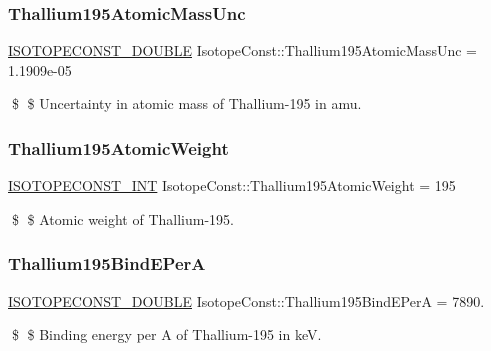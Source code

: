 \subsubsection{\texorpdfstring{Thallium195\+Atomic\+Mass\+Unc}{Thallium195AtomicMassUnc}}
{\footnotesize\ttfamily \mbox{\hyperlink{group___isotope_const-_macros_ga8f45a7272ce02c0b4c65c44636ed719a}{I\+S\+O\+T\+O\+P\+E\+C\+O\+N\+S\+T\+\_\+\+D\+O\+U\+B\+LE}} Isotope\+Const\+::\+Thallium195\+Atomic\+Mass\+Unc = 1.\+1909e-\/05}

\$ \$ Uncertainty in atomic mass of Thallium-\/195 in amu. \mbox{\label{group___isotope_const-_thallium-_tl195_gace0bae17108bd5e1c99ef020d8d00184}} 
\subsubsection{\texorpdfstring{Thallium195\+Atomic\+Weight}{Thallium195AtomicWeight}}
{\footnotesize\ttfamily \mbox{\hyperlink{group___isotope_const-_macros_ga5f18360b3e99483a35c32d789e62621c}{I\+S\+O\+T\+O\+P\+E\+C\+O\+N\+S\+T\+\_\+\+I\+NT}} Isotope\+Const\+::\+Thallium195\+Atomic\+Weight = 195}

\$ \$ Atomic weight of Thallium-\/195. \mbox{\label{group___isotope_const-_thallium-_tl195_ga50580592cfc79bf2a565b79cda903a25}} 
\subsubsection{\texorpdfstring{Thallium195\+Bind\+E\+PerA}{Thallium195BindEPerA}}
{\footnotesize\ttfamily \mbox{\hyperlink{group___isotope_const-_macros_ga8f45a7272ce02c0b4c65c44636ed719a}{I\+S\+O\+T\+O\+P\+E\+C\+O\+N\+S\+T\+\_\+\+D\+O\+U\+B\+LE}} Isotope\+Const\+::\+Thallium195\+Bind\+E\+PerA = 7890.}

\$ \$ Binding energy per A of Thallium-\/195 in keV. \mbox{\label{group___isotope_const-_thallium-_tl195_ga73fdbc2d6ea89d10e21d46375d6c3d43}} 
